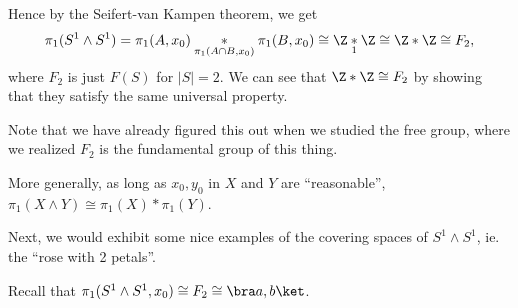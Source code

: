 \documentclass[a4paper]{article}
\begin{document}
\begin{eg}
  Hence by the Seifert-van Kampen theorem, we get
  \[
    \pi_1(S^1 \wedge S^1) = \pi_1(A, x_0)\underset{\pi_1(A\cap B, x_0)}{*} \pi_1(B, x_0) \cong \Z \underset{1}{*} \Z \cong \Z * \Z \cong F_2,
  \]
  where $F_2$ is just $F(S)$ for $|S| = 2$. We can see that $\Z*\Z \cong F_2$ by showing that they satisfy the same universal property.

  Note that we have already figured this out when we studied the free group, where we realized $F_2$ is the fundamental group of this thing.

  More generally, as long as $x_0, y_0$ in $X$ and $Y$ are ``reasonable'', $\pi_1(X\wedge Y) \cong \pi_1(X) * \pi_1(Y)$.
\end{eg}

Next, we would exhibit some nice examples of the covering spaces of $S^1 \wedge S^1$, ie. the ``rose with 2 petals''.

Recall that $\pi_1(S^1 \wedge S^1, x_0) \cong F_2 \cong \bra a, b\ket$.
\end{document}
